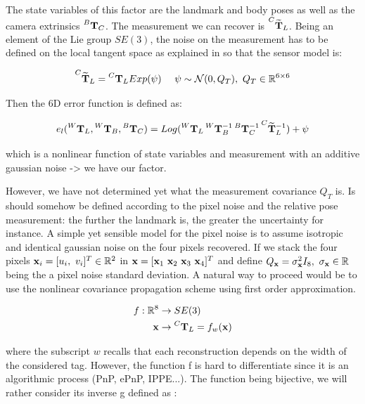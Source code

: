 \documentclass[11pt]{article}
\newcommand{\T}[2]{\prescript{#1}{}{\bfT}_{#2}}
\newcommand{\Tm}[2]{\prescript{#1}{}{\widetilde{\bfT}}_{#2}}
\newcommand{\Gaussian}[2]{\mathcal{N}({#1},{#2})}
\newcommand{\Reals}{\mathbb{R}}
\begin{document}
The state variables of this factor are the landmark and body poses as well as the camera extrinsics $\T{B}{C}$. The measurement we can recover is $\Tm{C}{L}$. Being an element of the Lie group $SE(3)$, the noise on the measurement has to be defined on the local tangent space as explained in \cite{barfoot2017state} so that the sensor model is:

\begin{equation}
    \Tm{C}{L} = \T{C}{L}Exp(\psi) ~~~~ \psi \sim \Gaussian{0}{Q_T}, ~Q_T \in \Reals^{6\times6}
\end{equation}

Then the 6D error function is defined as:

\begin{equation}
    e_{l}(\T{W}{L}, \T{W}{B}, \T{B}{C}) = Log(\T{W}{L} \T{W}{B}^{-1} \T{B}{C}^{-1} \Tm{C}{L}^{-1}) + \psi
\end{equation}

which is a nonlinear function of state variables and measurement with an additive gaussian noise -> we have our factor.

However, we have not determined yet what the measurement covariance $Q_T$ is. Is should somehow be defined according to the pixel noise and the relative pose measurement: the further the landmark is, the greater the uncertainty for instance. A simple yet sensible model for the pixel noise is to assume isotropic and identical gaussian noise on the four pixels recovered. If we stack the four pixels $\bfx_i = [u_i,~v_i]^T \in \Reals^{2}$ in ${\bf x} = [{\bf x}_1 ~{\bf x}_2~ {\bf x}_3~ {\bf x}_4]^T$ and define $Q_{\bfx} = \sigma_{\bfx}^2 I_8, ~\sigma_{\bfx} \in \Reals$ being the a pixel noise standard deviation.
A natural way to proceed would be to use the nonlinear covariance propagation scheme using first order approximation.

\begin{equation}
    \begin{split}
        f: \Reals^8 &\rightarrow SE(3) \\
                           \bfx &\rightarrow \T{C}{L} = f_w(\bfx)
    \end{split}
\end{equation}

where the subscript $w$ recalls that each reconstruction depends on the width of the considered tag. 
However, the function f is hard to differentiate since it is an algorithmic process (PnP, ePnP, IPPE...). The function being bijective, we will rather consider its inverse g defined as :
\end{document}

